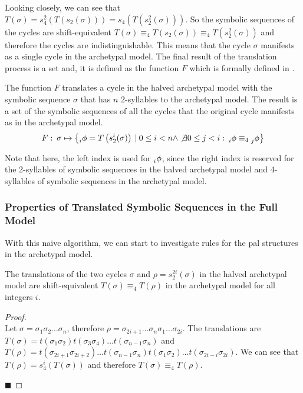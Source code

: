 Looking closely, we can see that $T(\sigma) = s_4^2\left(T\left(s_2(\sigma)\right)\right) = s_4\left(T\left(s_2^2(\sigma)\right)\right)$.
So the symbolic sequences of the cycles are shift-equivalent $T(\sigma) \equiv_4 T\left(s_2(\sigma)\right) \equiv_4 T\left(s_2^2(\sigma)\right)$ and therefore the cycles are indistinguishable.
This means that the cycle $\sigma$ manifests as a single cycle in the archetypal model.
The final result of the translation process is a set and, it is defined as the function $F$ which is formally defined in .

\begin{definition}
	\label{def:F}
	The function $F$ translates a cycle in the halved archetypal model with the symbolic sequence $\sigma$ that has $n$ 2-syllables to the archetypal model.
	The result is a set of the symbolic sequences of all the cycles that the original cycle manifests as in the archetypal model.
	\begin{align}
		F:\: \sigma \mapsto \left\{
		\prescript{}{i}{\phi} = T\left(s_2^i(\sigma)\right) \:|\:
		0 \leq i < n \land
		\not\exists 0 \leq j < i:\: \prescript{}{i}{\phi} \equiv_4 \prescript{}{j}{\phi}
		\right\}
	\end{align}
\end{definition}

Note that here, the left index is used for $\prescript{}{i}{\phi}$, since the right index is reserved for the 2-syllables of symbolic sequences in the halved archetypal model and 4-syllables of symbolic sequences in the archetypal model.

\subsubsection{Properties of Translated Symbolic Sequences in the Full Model}

With this naive algorithm, we can start to investigate rules for the \gls{pal} structures in the archetypal model.

\begin{lemma}
	\label{lemma:equivalence.translations}
	The translations of the two cycles $\sigma$ and $\rho = s_2^{2i}(\sigma)$ in the halved archetypal model are shift-equivalent $T(\sigma) \equiv_4 T(\rho)$ in the archetypal model for all integers $i$.
\end{lemma}

\begin{proof} \phantom{x} \\
	Let $\sigma = \sigma_1\sigma_2 \dots \sigma_n$, therefore $\rho = \sigma_{2i+1} \dots \sigma_n\sigma_1 \dots \sigma_{2i}$.
	The translations are $T(\sigma) = t(\sigma_1\sigma_2)t(\sigma_3\sigma_4) \dots t(\sigma_{n-1}\sigma_n)$
	and $T(\rho) = t(\sigma_{2i+1}\sigma_{2i+2}) \dots t(\sigma_{n-1}\sigma_n)t(\sigma_1\sigma_2) \dots t(\sigma_{2i-i}\sigma_{2i})$.
	We can see that $T(\rho) = s_4^i(T(\sigma))$ and therefore $T(\sigma) \equiv_4 T(\rho)$.

	\hfill $\blacksquare$
\end{proof}

